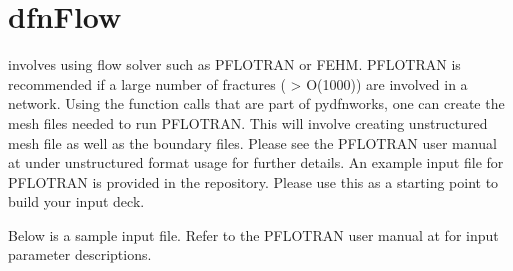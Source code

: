 \documentclass[letterpaper,10pt,english]{sphinxmanual}
\begin{document}
\begin{sphinxVerbatim}[commandchars=\\\{\}]
 

   

\end{sphinxVerbatim}


\chapter{dfnFlow}
\label{\detokenize{dfnflow:dfnflow}}\label{\detokenize{dfnflow::doc}}\label{\detokenize{dfnflow:dfnflow-chapter}}
 involves using flow solver such as PFLOTRAN or FEHM. PFLOTRAN is recommended if a large number of fractures ( \textgreater{} O(1000)) are involved in a network. Using the function calls that are part of pydfnworks, one can create the mesh files needed to run PFLOTRAN. This will involve creating unstructured mesh file  as well as the boundary   files. Please see the PFLOTRAN user manual at  under unstructured  format usage for further details. An example input file for PFLOTRAN is provided in the repository. Please use this as a starting point to build your input deck.

Below is a sample input file. Refer to the PFLOTRAN user manual at  for input parameter descriptions.
\end{document}
